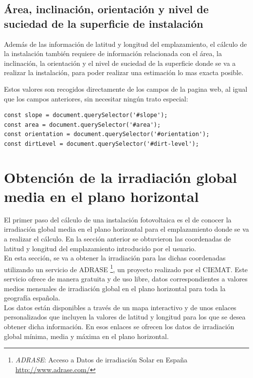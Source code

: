 \documentclass[11pt]{report}
\begin{document}
\subsection{Área, inclinación, orientación y nivel de suciedad de la superficie de instalación}

Además de las información de latitud y longitud del emplazamiento, el cálculo de la instalación también requiere de información relacionada con el área, la inclinación, la orientación y el nivel de suciedad de la superficie donde se va a realizar la instalación, para poder realizar una estimación lo mas exacta posible.

Estos valores son recogidos directamente de los campos de la pagina web, al igual que los campos anteriores, sin necesitar ningún trato especial:\\
\begin{lstlisting}[style=ES6, caption={Variables correspondientes a los campos indicados}]
const slope = document.querySelector('#slope');
const area = document.querySelector('#area');
const orientation = document.querySelector('#orientation');
const dirtLevel = document.querySelector('#dirt-level');
\end{lstlisting}

\section{Obtención de la irradiación global media en el plano horizontal}

El primer paso del cálculo de una instalación fotovoltaica es el de conocer la irradiación global media en el plano horizontal para el emplazamiento donde se va a realizar el cálculo. En la sección anterior se obtuvieron las coordenadas de latitud y longitud del emplazamiento introducido por el usuario.\\

En esta sección, se va a obtener la irradiación para las dichas coordenadas utilizando un servicio de ADRASE \footnote{\textit{ADRASE}: Acceso a Datos de irradiación Solar en España \url{http://www.adrase.com/}}, un proyecto realizado por el CIEMAT. Este servicio ofrece de manera gratuita y de uso libre, datos correspondientes a valores medios mensuales de irradiación global en el plano horizontal para toda la geografía española.\\

Los datos están disponibles a través de un mapa interactivo y de unos enlaces personalizados que incluyen la valores de latitud y longitud para los que se desea obtener dicha información. En esos enlaces se ofrecen los datos de irradiación global mínima, media y máxima en el plano horizontal.\\
\end{document}

